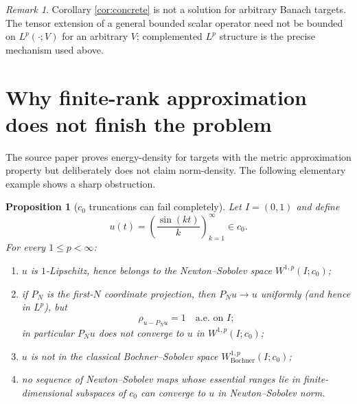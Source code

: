 \documentclass[11pt]{article}
\newtheorem{proposition}[theorem]{Proposition}
\theoremstyle{remark}
\newtheorem{remark}[theorem]{Remark}
\newcommand{\Wp}{W^{1,p}}
\newcommand{\rhoMin}[1]{\rho_{#1}}
\begin{document}
\begin{remark}
Corollary \ref{cor:concrete} is not a solution for arbitrary Banach targets.
The tensor extension of a general bounded scalar operator need not be bounded
on $L^p(\cdot;V)$ for an arbitrary $V$; complemented $L^p$ structure is the
precise mechanism used above.
\end{remark}

\section{Why finite-rank approximation does not finish the problem}

The source paper proves energy-density for targets with the metric
approximation property but deliberately does not claim norm-density.  The
following elementary example shows a sharp obstruction.

\begin{proposition}[$c_0$ truncations can fail completely]
\label{prop:c0}
Let $I=(0,1)$ and define
\[
  u(t)=\left(\frac{\sin(kt)}{k}\right)_{k=1}^{\infty}\in c_0.
\]
For every $1\le p<\infty$:
\begin{enumerate}[label=\textup{(\roman*)},leftmargin=2em]
  \item $u$ is $1$-Lipschitz, hence belongs to the Newton--Sobolev space
  $\Wp(I;c_0)$;
  \item if $P_N$ is the first-$N$ coordinate projection, then
  $P_Nu\to u$ uniformly (and hence in $L^p$), but
  \[
    \rhoMin{u-P_Nu}=1\quad\text{a.e. on }I;
  \]
  in particular $P_Nu$ does not converge to $u$ in $\Wp(I;c_0)$;
  \item $u$ is not in the classical Bochner--Sobolev space
  $\Wp_{\mathrm{Bochner}}(I;c_0)$;
  \item no sequence of Newton--Sobolev maps whose essential ranges lie in
  finite-dimensional subspaces of $c_0$ can converge to $u$ in Newton--Sobolev
  norm.
\end{enumerate}
\end{proposition}
\end{document}
